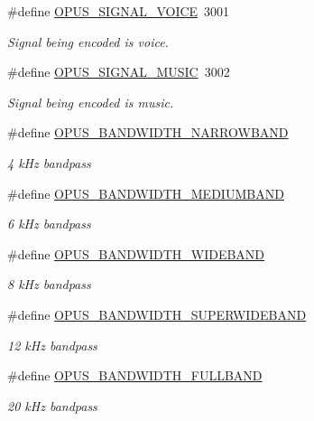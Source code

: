 \begin{DoxyCompactItemize}
\#define \hyperlink{group__opus__ctlvalues_ga085a116fed816373d3b9eae28df49404}{OPUS\_\-SIGNAL\_\-VOICE}~3001
\begin{DoxyCompactList}\small\item\em Signal being encoded is voice. \item\end{DoxyCompactList}\item 
\#define \hyperlink{group__opus__ctlvalues_gaa0c228c664b6d426f4c213e3a5350889}{OPUS\_\-SIGNAL\_\-MUSIC}~3002
\begin{DoxyCompactList}\small\item\em Signal being encoded is music. \item\end{DoxyCompactList}\item 
\#define \hyperlink{group__opus__ctlvalues_ga607dd310958b9c7d545d005e4572d47f}{OPUS\_\-BANDWIDTH\_\-NARROWBAND}
\begin{DoxyCompactList}\small\item\em 4 kHz bandpass \item\end{DoxyCompactList}\item 
\#define \hyperlink{group__opus__ctlvalues_ga53a2aff4dc0ee23682927ca568c422a3}{OPUS\_\-BANDWIDTH\_\-MEDIUMBAND}
\begin{DoxyCompactList}\small\item\em 6 kHz bandpass \item\end{DoxyCompactList}\item 
\#define \hyperlink{group__opus__ctlvalues_gac698e5d1281a3632251d2a4ead48afb9}{OPUS\_\-BANDWIDTH\_\-WIDEBAND}
\begin{DoxyCompactList}\small\item\em 8 kHz bandpass \item\end{DoxyCompactList}\item 
\#define \hyperlink{group__opus__ctlvalues_ga41f86df35af0033a7361895da88671c1}{OPUS\_\-BANDWIDTH\_\-SUPERWIDEBAND}
\begin{DoxyCompactList}\small\item\em 12 kHz bandpass \item\end{DoxyCompactList}\item 
\#define \hyperlink{group__opus__ctlvalues_ga74cb052d8ec36cbcc9708c417558ebdd}{OPUS\_\-BANDWIDTH\_\-FULLBAND}
\begin{DoxyCompactList}\small\item\em 20 kHz bandpass \item\end{DoxyCompactList}\end{DoxyCompactItemize}


